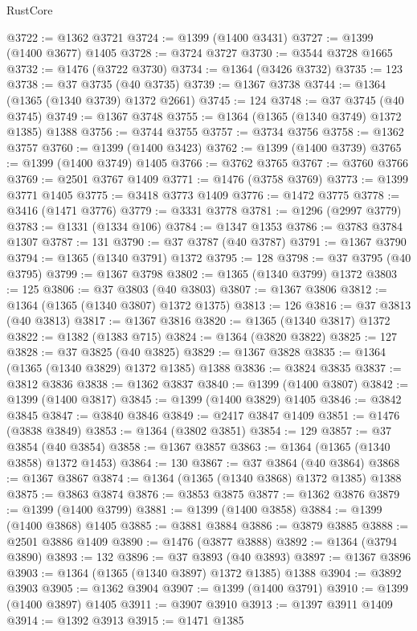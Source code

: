 \begin{lexlean}{RustCore}
\begin{coremodule}
@3722 := @1362 @3721
@3724 := @1399 (@1400 @3431)
@3727 := @1399 (@1400 @3677) @1405
@3728 := @3724 @3727
@3730 := @3544 @3728 @1665
@3732 := @1476 (@3722 @3730)
@3734 := @1364 (@3426 @3732)
@3735 := 123
@3738 := @37 @3735 (@40 @3735)
@3739 := @1367 @3738
@3744 := @1364 (@1365 (@1340 @3739) @1372 @2661)
@3745 := 124
@3748 := @37 @3745 (@40 @3745)
@3749 := @1367 @3748
@3755 := @1364 (@1365 (@1340 @3749) @1372 @1385) @1388
@3756 := @3744 @3755
@3757 := @3734 @3756
@3758 := @1362 @3757
@3760 := @1399 (@1400 @3423)
@3762 := @1399 (@1400 @3739)
@3765 := @1399 (@1400 @3749) @1405
@3766 := @3762 @3765
@3767 := @3760 @3766
@3769 := @2501 @3767 @1409
@3771 := @1476 (@3758 @3769)
@3773 := @1399 @3771 @1405
@3775 := @3418 @3773 @1409
@3776 := @1472 @3775
@3778 := @3416 (@1471 @3776)
@3779 := @3331 @3778
@3781 := @1296 (@2997 @3779)
@3783 := @1331 (@1334 @106)
@3784 := @1347 @1353
@3786 := @3783 @3784 @1307
@3787 := 131
@3790 := @37 @3787 (@40 @3787)
@3791 := @1367 @3790
@3794 := @1365 (@1340 @3791) @1372
@3795 := 128
@3798 := @37 @3795 (@40 @3795)
@3799 := @1367 @3798
@3802 := @1365 (@1340 @3799) @1372
@3803 := 125
@3806 := @37 @3803 (@40 @3803)
@3807 := @1367 @3806
@3812 := @1364 (@1365 (@1340 @3807) @1372 @1375)
@3813 := 126
@3816 := @37 @3813 (@40 @3813)
@3817 := @1367 @3816
@3820 := @1365 (@1340 @3817) @1372
@3822 := @1382 (@1383 @715)
@3824 := @1364 (@3820 @3822)
@3825 := 127
@3828 := @37 @3825 (@40 @3825)
@3829 := @1367 @3828
@3835 := @1364 (@1365 (@1340 @3829) @1372 @1385) @1388
@3836 := @3824 @3835
@3837 := @3812 @3836
@3838 := @1362 @3837
@3840 := @1399 (@1400 @3807)
@3842 := @1399 (@1400 @3817)
@3845 := @1399 (@1400 @3829) @1405
@3846 := @3842 @3845
@3847 := @3840 @3846
@3849 := @2417 @3847 @1409
@3851 := @1476 (@3838 @3849)
@3853 := @1364 (@3802 @3851)
@3854 := 129
@3857 := @37 @3854 (@40 @3854)
@3858 := @1367 @3857
@3863 := @1364 (@1365 (@1340 @3858) @1372 @1453)
@3864 := 130
@3867 := @37 @3864 (@40 @3864)
@3868 := @1367 @3867
@3874 := @1364 (@1365 (@1340 @3868) @1372 @1385) @1388
@3875 := @3863 @3874
@3876 := @3853 @3875
@3877 := @1362 @3876
@3879 := @1399 (@1400 @3799)
@3881 := @1399 (@1400 @3858)
@3884 := @1399 (@1400 @3868) @1405
@3885 := @3881 @3884
@3886 := @3879 @3885
@3888 := @2501 @3886 @1409
@3890 := @1476 (@3877 @3888)
@3892 := @1364 (@3794 @3890)
@3893 := 132
@3896 := @37 @3893 (@40 @3893)
@3897 := @1367 @3896
@3903 := @1364 (@1365 (@1340 @3897) @1372 @1385) @1388
@3904 := @3892 @3903
@3905 := @1362 @3904
@3907 := @1399 (@1400 @3791)
@3910 := @1399 (@1400 @3897) @1405
@3911 := @3907 @3910
@3913 := @1397 @3911 @1409
@3914 := @1392 @3913
@3915 := @1471 @1385

\end{coremodule}
\end{lexlean}
